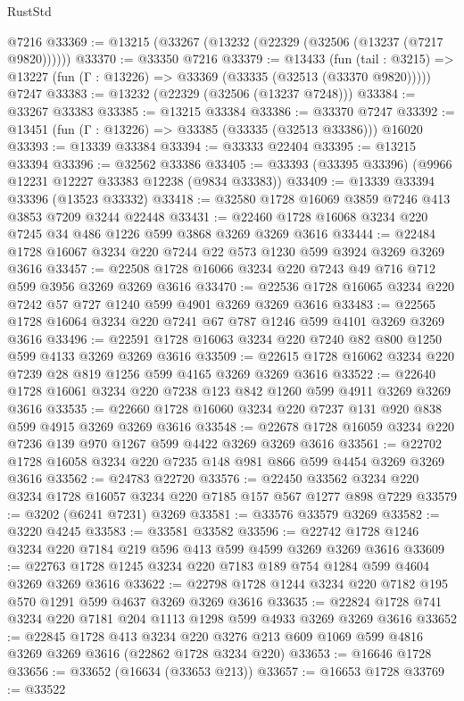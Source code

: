 \begin{lexlean}{RustStd}
\begin{coremodule}
    @7216
@33369 := @13215 (@33267 (@13232 (@22329 (@32506 (@13237 (@7217 @9820))))))
@33370 := @33350 @7216
@33379 := @13433
    (fun (tail : @3215) => @13227 (fun (Γ : @13226) => @33369 (@33335 (@32513 (@33370 @9820)))))
    @7247
@33383 := @13232 (@22329 (@32506 (@13237 @7248)))
@33384 := @33267 @33383
@33385 := @13215 @33384
@33386 := @33370 @7247
@33392 := @13451 (fun (Γ : @13226) => @33385 (@33335 (@32513 @33386))) @16020
@33393 := @13339 @33384
@33394 := @33333 @22404
@33395 := @13215 @33394
@33396 := @32562 @33386
@33405 := @33393 (@33395 @33396) (@9966 @12231 @12227 @33383 @12238 (@9834 @33383))
@33409 := @13339 @33394 @33396 (@13523 @33332)
@33418 := @32580 @1728 @16069 @3859 @7246 @413 @3853 @7209 @3244 @22448
@33431 := @22460 @1728 @16068 @3234 @220 @7245 @34 @486 @1226 @599 @3868 @3269 @3269 @3616
@33444 := @22484 @1728 @16067 @3234 @220 @7244 @22 @573 @1230 @599 @3924 @3269 @3269 @3616
@33457 := @22508 @1728 @16066 @3234 @220 @7243 @49 @716 @712 @599 @3956 @3269 @3269 @3616
@33470 := @22536 @1728 @16065 @3234 @220 @7242 @57 @727 @1240 @599 @4901 @3269 @3269 @3616
@33483 := @22565 @1728 @16064 @3234 @220 @7241 @67 @787 @1246 @599 @4101 @3269 @3269 @3616
@33496 := @22591 @1728 @16063 @3234 @220 @7240 @82 @800 @1250 @599 @4133 @3269 @3269 @3616
@33509 := @22615 @1728 @16062 @3234 @220 @7239 @28 @819 @1256 @599 @4165 @3269 @3269 @3616
@33522 := @22640 @1728 @16061 @3234 @220 @7238 @123 @842 @1260 @599 @4911 @3269 @3269 @3616
@33535 := @22660 @1728 @16060 @3234 @220 @7237 @131 @920 @838 @599 @4915 @3269 @3269 @3616
@33548 := @22678 @1728 @16059 @3234 @220 @7236 @139 @970 @1267 @599 @4422 @3269 @3269 @3616
@33561 := @22702 @1728 @16058 @3234 @220 @7235 @148 @981 @866 @599 @4454 @3269 @3269 @3616
@33562 := @24783 @22720
@33576 := @22450 @33562 @3234 @220 @3234 @1728 @16057 @3234 @220 @7185 @157 @567 @1277 @898 @7229
@33579 := @3202 (@6241 @7231) @3269
@33581 := @33576 @33579 @3269
@33582 := @3220 @4245
@33583 := @33581 @33582
@33596 := @22742 @1728 @1246 @3234 @220 @7184 @219 @596 @413 @599 @4599 @3269 @3269 @3616
@33609 := @22763 @1728 @1245 @3234 @220 @7183 @189 @754 @1284 @599 @4604 @3269 @3269 @3616
@33622 := @22798 @1728 @1244 @3234 @220 @7182 @195 @570 @1291 @599 @4637 @3269 @3269 @3616
@33635 := @22824 @1728 @741 @3234 @220 @7181 @204 @1113 @1298 @599 @4933 @3269 @3269 @3616
@33652 := @22845
    @1728
    @413
    @3234
    @220
    @3276
    @213
    @609
    @1069
    @599
    @4816
    @3269
    @3269
    @3616
    (@22862 @1728 @3234 @220)
@33653 := @16646 @1728
@33656 := @33652 (@16634 (@33653 @213))
@33657 := @16653 @1728
@33769 := @33522

\end{coremodule}
\end{lexlean}

